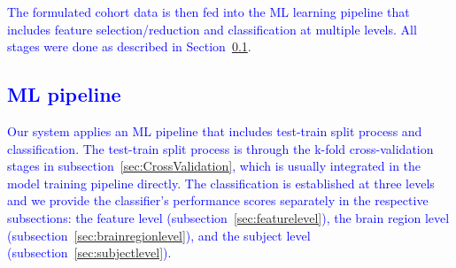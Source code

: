 \textcolor{blue}{The formulated cohort data is then fed into the ML learning pipeline that includes  feature selection/reduction and classification at multiple levels. All stages were done as described in Section~\ref{sec:MLpipeline}}.





\subsection{\textcolor{blue}{ ML pipeline}}
\label{sec:MLpipeline}


\textcolor{blue}{ Our system  applies  an  ML  pipeline  that  includes test-train split process and classification. The test-train split process is through the k-fold cross-validation stages in subsection~\ref{sec:CrossValidation}, which is usually integrated in the model training pipeline directly. The classification is established at three levels and we provide the classifier’s performance scores separately in the respective subsections: the feature level (subsection~\ref{sec:featurelevel}),  the brain region level (subsection~\ref{sec:brainregionlevel}), and the subject level (subsection~\ref{sec:subjectlevel}). }
 
